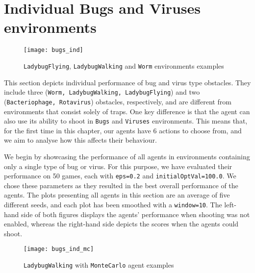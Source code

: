 \section{Individual Bugs and Viruses environments}
\begin{figure}[h]
    \centering
    \texttt{[image: bugs\_ind]}
    \caption{\texttt{LadybugFlying}, \texttt{LadybugWalking} and \texttt{Worm} environments examples}
    \label{fig:bugs_ind_eg}
\end{figure}

This section depicts individual performance of bug and virus type obstacles. They include three (\texttt{Worm, LadybugWalking, LadybugFlying}) and two \\ (\texttt{Bacteriophage, Rotavirus}) obstacles, respectively, and are different from environments that consist solely of traps. One key difference is that the agent can also use its ability to shoot in \texttt{Bugs} and \texttt{Viruses} environments. This means that, for the first time in this chapter, our agents have 6 actions to choose from, and we aim to analyse how this affects their behaviour.

We begin by showcasing the performance of all agents in environments containing only a single type of bug or virus. For this purpose, we have evaluated their performance on 50 games, each with \texttt{eps=0.2} and \texttt{initialOptVal=100.0}. We chose these parameters as they resulted in the best overall performance of the agents. The plots presenting all agents in this section are an average of five different seeds, and each plot has been smoothed with a \texttt{window=10}. The left-hand side of both figures displays the agents' performance when shooting was not enabled, whereas the right-hand side depicts the scores when the agents could shoot.

\begin{figure}[h]
    \centering
    \texttt{[image: bugs\_ind\_mc]}
    \caption{\texttt{LadybugWalking} with \texttt{MonteCarlo} agent examples}
    \label{fig:bugs_ind_mc_eg}
\end{figure}

